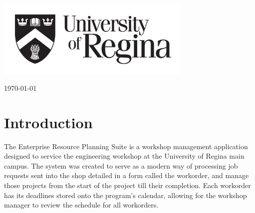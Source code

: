 \begin{titlepage}
	
	\vfill\vfill\vfill\vfill
	\includegraphics[width=0.7\textwidth]{UR.png}\\[2cm] %
	 

	
	\vfill\vfill\vfill %
	
	{\large\today} %
	
	
	\vfill %
	
\end{titlepage}



\newpage 
\tableofcontents

\newpage
\listoffigures


\newpage
\section{Introduction}
The Enterprise Resource Planning Suite is a workshop management application designed to service the engineering workshop at the University of Regina main campus. The system was created to serve as a modern way of processing job requests sent into the shop detailed in a form called the workorder, and manage those projects from the start of the project till their completion. Each workorder has its deadlines stored onto the program's calendar, allowing for the workshop manager to review the schedule for all workorders. 

